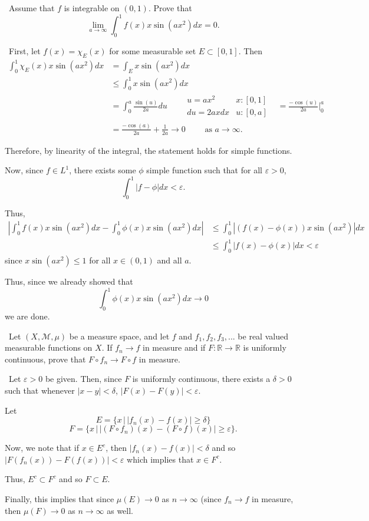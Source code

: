 \documentclass[12pt]{Qual}
\begin{document}
\begin{problem} $\,$
Assume that $f$ is integrable on $(0,1)$. Prove that $$\lim_{a\to\infty}\int_0^1f(x)x\sin(ax^2)dx=0.$$
\end{problem}


\begin{solution}$\,$
First, let $f(x)=\chi_E(x)$ for some measurable set $E\subset[0,1]$. Then \begin{align*}
    \int_0^1\chi_E(x)x\sin(ax^2)dx&=\int_Ex\sin(ax^2)dx\\
    &\le\int_0^1x\sin(ax^2)dx\\
    &=\int_0^a\frac{\sin(u)}{2a}du\qquad \begin{matrix}
    u=ax^2 &  x:[0,1]\\
    du=2axdx & u:[0,a]
\end{matrix}
&=\frac{-\cos(u)}{2a}\bigg|_0^a\\
&=\frac{-\cos(a)}{2a}+\frac{1}{2a}\to0\qquad\text{ as }a\to\infty.
\end{align*}

Therefore, by linearity of the integral, the statement holds for simple functions.

Now, since $f\in L^1$, there exists some $\phi$ simple function such that for all $\varepsilon>0$, $$\int_0^1|f-\phi|dx<\varepsilon.$$

Thus, \begin{align*}
    \left|\int_0^1f(x)x\sin(ax^2)dx-\int_0^1\phi(x)x\sin(ax^2)dx\right|&\le\int_0^1|(f(x)-\phi(x))x\sin(ax^2)|dx\\
    &\le\int_0^1|f(x)-\phi(x)|dx<\varepsilon
\end{align*} since $x\sin(ax^2)\le1$ for all $x\in(0,1)$ and all $a$.

Thus, since we already showed that $$\int_0^1\phi(x)x\sin(ax^2)dx\to0$$ we are done.
\end{solution}
\newpage

\begin{problem} $\,$
Let $(X,\mathscr{M},\mu)$ be a measure space, and let $f$ and $f_1,f_2,f_3,...$ be real valued measurable functions on $X$. If $f_n\to f$ in measure and if $F:\mathbb{R}\to\mathbb{R}$ is uniformly continuous, prove that $F\circ f_n\to F\circ f$ in measure.
\end{problem}


\begin{solution}$\,$
Let $\varepsilon>0$ be given. Then, since $F$ is uniformly continuous, there exists a $\delta>0$ such that whenever $|x-y|<\delta$, $|F(x)-F(y)|<\varepsilon.$

Let $$E=\{x\,|\,|f_n(x)-f(x)|\ge\delta\}$$
$$F=\{x\,|\,|(F\circ f_n)(x)-(F\circ f)(x)|\ge\varepsilon\}.$$

Now, we note that if $x\in E^c$, then $|f_n(x)-f(x)|<\delta$ and so $|F(f_n(x))-F(f(x))|<\varepsilon$ which implies that $x\in F^c$.

Thus, $E^c\subset F^c$ and so $F\subset E$.

Finally, this implies that since $\mu(E)\to0$ as $n\to\infty$ (since $f_n\to f$ in measure, then $\mu(F)\to0$ as $n\to\infty$ as well.
\end{solution}
\newpage
\end{document}
